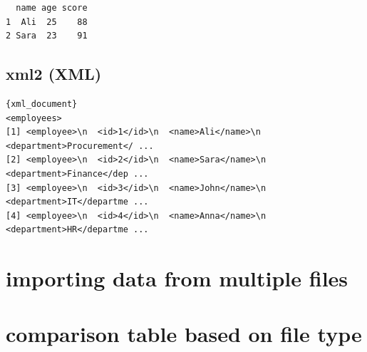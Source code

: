 \documentclass[
  doc,
  longtable,
  a4paper,
  nolmodern,
  notxfonts,
  notimes,
  colorlinks=true,linkcolor=blue,citecolor=blue,urlcolor=blue]{apa7}
\begin{document}
\begin{verbatim}
  name age score
1  Ali  25    88
2 Sara  23    91
\end{verbatim}

\subsection{xml2 (XML)}\label{xml2-xml}

\begin{verbatim}
{xml_document}
<employees>
[1] <employee>\n  <id>1</id>\n  <name>Ali</name>\n  <department>Procurement</ ...
[2] <employee>\n  <id>2</id>\n  <name>Sara</name>\n  <department>Finance</dep ...
[3] <employee>\n  <id>3</id>\n  <name>John</name>\n  <department>IT</departme ...
[4] <employee>\n  <id>4</id>\n  <name>Anna</name>\n  <department>HR</departme ...
\end{verbatim}

\section{importing data from multiple
files}\label{importing-data-from-multiple-files}

\section{comparison table based on file
type}\label{comparison-table-based-on-file-type}
\end{document}
